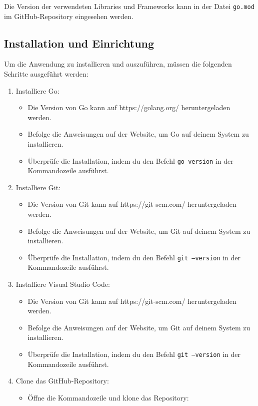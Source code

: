 Die Version der verwendeten Libraries und Frameworks kann in der Datei \texttt{go.mod} im GitHub-Repository eingesehen werden.

\newpage
\subsection{Installation und Einrichtung}

Um die Anwendung zu installieren und auszuführen, müssen die folgenden Schritte ausgeführt werden:

\begin{enumerate}
    \item Installiere Go:
    \begin{itemize}
        \item Die Version von Go kann auf https://golang.org/ heruntergeladen werden.
        \item Befolge die Anweisungen auf der Website, um Go auf deinem System zu installieren.
        \item Überprüfe die Installation, indem du den Befehl \texttt{go version} in der Kommandozeile ausführst.
    \end{itemize}

    \item Installiere Git:
    \begin{itemize}
        \item Die Version von Git kann auf https://git-scm.com/ heruntergeladen werden.
        \item Befolge die Anweisungen auf der Website, um Git auf deinem System zu installieren.
        \item Überprüfe die Installation, indem du den Befehl \texttt{git --version} in der Kommandozeile ausführst.
    \end{itemize}

    \item Installiere Visual Studio Code:
    \begin{itemize}
        \item Die Version von Git kann auf https://git-scm.com/ heruntergeladen werden.
        \item Befolge die Anweisungen auf der Website, um Git auf deinem System zu installieren.
        \item Überprüfe die Installation, indem du den Befehl \texttt{git --version} in der Kommandozeile ausführst.
    \end{itemize}

    \item Clone das GitHub-Repository:
    \begin{itemize}
        \item Öffne die Kommandozeile und klone das Repository:
        

\end{itemize}
\end{enumerate}
